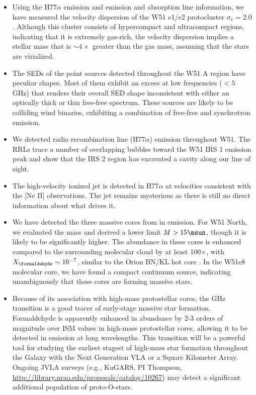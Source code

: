 \begin{itemize}
    \item Using the H$77\alpha$ emission and \formaldehyde emission and absorption
        line information, we have measured the velocity dispersion of the W51
        e1/e2 protocluster $\sigma_v=2.0$ \kms.  Although this cluster consists
        of hypercompact and ultracompact \hii regions, indicating that it is
        extremely gas-rich, the velocity dispersion implies a stellar mass that
        is $\sim4\times$ greater than the gas mass, assuming that the stars are
        virialized.

\item The SEDs of the point sources detected throughout the W51 A region have
peculiar shapes.  Most of them exhibit an excess at low frequencies ($<5$ GHz)
that renders their overall SED shape inconsistent with either an optically
thick or thin free-free spectrum.  These sources are likely to be colliding
wind binaries, exhibiting a combination of free-free and synchrotron emission.


\item We detected radio recombination line (H77$\alpha$) emission throughout
    W51.  The RRLs trace a number of overlapping bubbles toward the W51 IRS 1
    emission peak and show that the IRS 2 region has excavated a cavity along
    our line of sight.  

\item The \citet{Lacy2007a} high-velocity ionized jet is detected in
    H77$\alpha$ at velocities consistent with the [Ne II] observations.
    The jet remains mysterious as there is still no direct information about
    what drives it.  

\item We have detected the three massive cores from \citet{Zhang1997a} in
\formaldehyde \twotwo emission.  For W51 North, we evaluated the mass and
derived a lower limit $M>15 \msun$, though it is likely to be significantly
higher.  The \formaldehyde abundance in these cores is enhanced compared to the
surrounding molecular cloud by at least 100$\times$, with $X_{\formaldehyde}
\sim 10^{-7}$, similar to the Orion BN/KL hot core \citep{Mangum1993b}.  In the W51e8 molecular
core, we have found a compact continuum source, indicating unambiguously that
these cores are forming massive stars.

\item Because of its association with high-mass protostellar cores,
    the \formaldehyde {} GHz transition is a good tracer of
    early-stage massive star formation.  Formaldehyde is apparently enhanced in
    abundance by 2-3
orders of magnitude over ISM values in high-mass protostellar cores, allowing
it to be detected in emission at long wavelengths.  This transition will be a
powerful tool
for studying the earliest stagest of high-mass star formation throughout the
Galaxy with the Next Generation VLA or a Square Kilometer Array.  Ongoing JVLA surveys (e.g.,
KuGARS, PI Thompson, \url{http://library.nrao.edu/proposals/catalog/10267}) may
detect a significant additional population of proto-O-stars.


\end{itemize}
